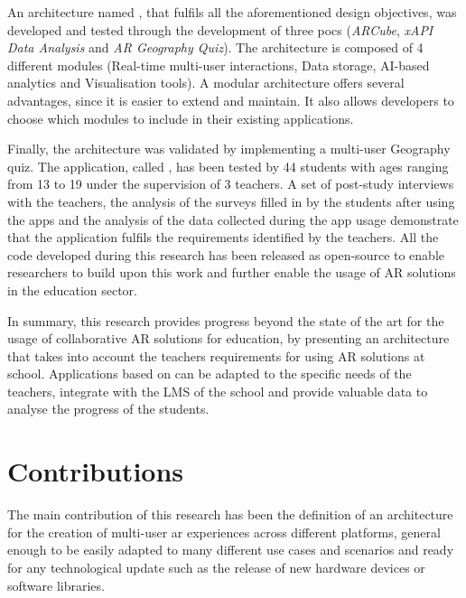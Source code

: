 An architecture named \arch{}, that fulfils all the aforementioned design objectives, was developed and tested through the development of three \glspl{poc} (\textit{ARCube}, \textit{xAPI Data Analysis} and \textit{AR Geography Quiz}). The architecture is composed of 4 different modules (Real-time multi-user interactions, Data storage, AI-based analytics and Visualisation tools). A modular architecture offers several advantages, since it is easier to extend and maintain. It also allows developers to choose which modules to include in their existing applications.

Finally, the architecture was validated by implementing a multi-user Geography quiz. The application, called \appname{}, has been tested by 44 students with ages ranging from 13 to 19 under the supervision of 3 teachers. A set of post-study interviews with the teachers, the analysis of the surveys filled in by the students after using the apps and the analysis of the data collected during the app usage demonstrate that the application fulfils the requirements identified by the teachers. All the code developed during this research has been released as open-source to enable researchers to build upon this work and further enable the usage of AR solutions in the education sector.

In summary, this research provides progress beyond the state of the art for the usage of collaborative AR solutions for education, by presenting an architecture that takes into account the teachers requirements for using AR solutions at school. Applications based on \arch{} can be adapted to the specific needs of the teachers, integrate with the LMS of the school and provide valuable data to analyse the progress of the students.

\section{Contributions}\label{sec:contribs}
The main contribution of this research has been the definition of an architecture for the creation of multi-user \gls{ar} experiences across different platforms, general enough to be easily adapted to many different use cases and scenarios and ready for any technological update such as the release of new hardware devices or software libraries. 

